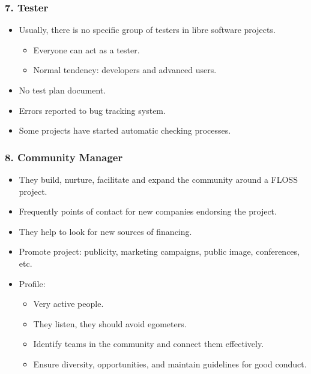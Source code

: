 \documentclass{beamer}
\begin{document}

\begin{frame}
 \frametitle{7. Tester}
 \begin{itemize}
  \item Usually, there is no specific group of testers in libre software projects.
  \begin{itemize}
   \item Everyone can act as a tester.
   \item Normal tendency: developers and advanced users.
  \end{itemize}
  \item No test plan document.
  \item Errors reported to bug tracking system.
  \item Some projects have started automatic checking processes.
 \end{itemize}

\end{frame}


\begin{frame}
 \frametitle{8. Community Manager}
 \begin{itemize}
  \item They build, nurture, facilitate and expand the community around
  a FLOSS project.
  \item Frequently points of contact for new companies endorsing the project.
  \item They help to look for new sources of financing.
  \item Promote project: publicity, marketing campaigns, public image, conferences, etc.
  \item Profile:
  \begin{itemize}
   \item Very active people.
   \item They listen, they should avoid egometers.
   \item Identify teams in the community and connect them effectively.
   \item Ensure diversity, opportunities, and maintain guidelines for good conduct.
  \end{itemize}

 \end{itemize}

\end{frame}
\end{document}
